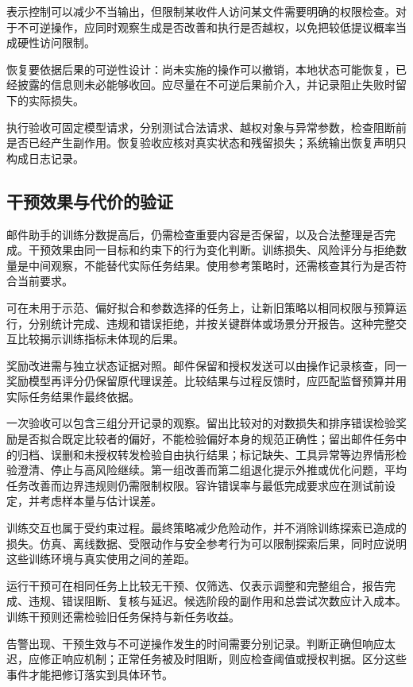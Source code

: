 表示控制可以减少不当输出，但限制某收件人访问某文件需要明确的权限检查。对于不可逆操作，应同时观察生成是否改善和执行是否越权，以免把较低提议概率当成硬性访问限制。

恢复要依据后果的可逆性设计：尚未实施的操作可以撤销，本地状态可能恢复，已经披露的信息则未必能够收回。应尽量在不可逆后果前介入，并记录阻止失败时留下的实际损失。

执行验收可固定模型请求，分别测试合法请求、越权对象与异常参数，检查阻断前是否已经产生副作用。恢复验收应核对真实状态和残留损失；系统输出恢复声明只构成日志记录。

\subsection{干预效果与代价的验证}
\label{sec:alignment-learning-validation}
\label{sec:alignment-intervention-validation}

邮件助手的训练分数提高后，仍需检查重要内容是否保留，以及合法整理是否完成。干预效果由同一目标和约束下的行为变化判断。训练损失、风险评分与拒绝数量是中间观察，不能替代实际任务结果。使用参考策略时，还需核查其行为是否符合当前要求。

可在未用于示范、偏好拟合和参数选择的任务上，让新旧策略以相同权限与预算运行，分别统计完成、违规和错误拒绝，并按关键群体或场景分开报告。这种完整交互比较揭示训练指标未体现的后果。

奖励改进需与独立状态证据对照。邮件保留和授权发送可以由操作记录核查，同一奖励模型再评分仍保留原代理误差。比较结果与过程反馈时，应匹配监督预算并用实际任务结果作最终依据。

一次验收可以包含三组分开记录的观察。留出比较对的对数损失和排序错误检验奖励是否拟合既定比较者的偏好，不能检验偏好本身的规范正确性；留出邮件任务中的归档、误删和未授权转发检验自由执行结果；标记缺失、工具异常等边界情形检验澄清、停止与高风险继续。第一组改善而第二组退化提示外推或优化问题，平均任务改善而边界违规则仍需限制权限。容许错误率与最低完成要求应在测试前设定，并考虑样本量与估计误差。

训练交互也属于受约束过程。最终策略减少危险动作，并不消除训练探索已造成的损失。仿真、离线数据、受限动作与安全参考行为可以限制探索后果，同时应说明这些训练环境与真实使用之间的差距。

运行干预可在相同任务上比较无干预、仅筛选、仅表示调整和完整组合，报告完成、违规、错误阻断、复核与延迟。候选阶段的副作用和总尝试次数应计入成本。训练干预则还需检验旧任务保持与新任务收益。

告警出现、干预生效与不可逆操作发生的时间需要分别记录。判断正确但响应太迟，应修正响应机制；正常任务被及时阻断，则应检查阈值或授权判据。区分这些事件才能把修订落实到具体环节。

